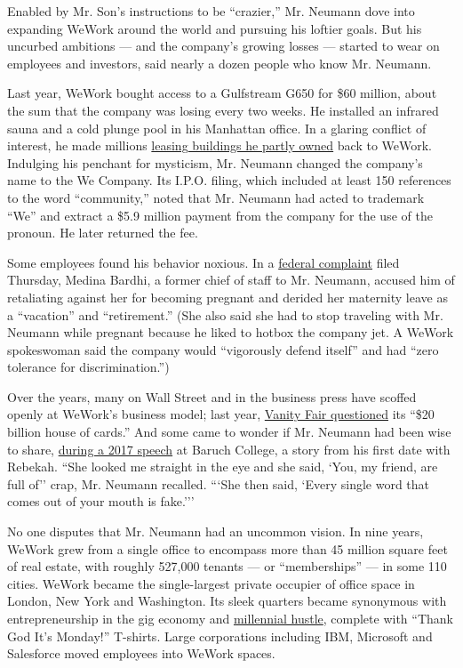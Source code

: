 Enabled by Mr. Son's instructions to be ``crazier,'' Mr. Neumann dove
into expanding WeWork around the world and pursuing his loftier goals.
But his uncurbed ambitions --- and the company's growing losses ---
started to wear on employees and investors, said nearly a dozen people
who know Mr. Neumann.

Last year, WeWork bought access to a Gulfstream G650 for \$60 million,
about the sum that the company was losing every two weeks. He installed
an infrared sauna and a cold plunge pool in his Manhattan office. In a
glaring conflict of interest, he made millions
\href{https://www.wsj.com/articles/weworks-ceo-makes-millions-as-landlord-to-wework-11547640000}{leasing
buildings he partly owned} back to WeWork. Indulging his penchant for
mysticism, Mr. Neumann changed the company's name to the We Company. Its
I.P.O. filing, which included at least 150 references to the word
``community,'' noted that Mr. Neumann had acted to trademark ``We'' and
extract a \$5.9 million payment from the company for the use of the
pronoun. He later returned the fee.

Some employees found his behavior noxious. In a
\href{https://www.nytimes3xbfgragh.onion/2019/10/31/business/wework-neumann-discrimination-complaint.html}{federal
complaint} filed Thursday, Medina Bardhi, a former chief of staff to Mr.
Neumann, accused him of retaliating against her for becoming pregnant
and derided her maternity leave as a ``vacation'' and ``retirement.''
(She also said she had to stop traveling with Mr. Neumann while pregnant
because he liked to hotbox the company jet. A WeWork spokeswoman said
the company would ``vigorously defend itself'' and had ``zero tolerance
for discrimination.'')

Over the years, many on Wall Street and in the business press have
scoffed openly at WeWork's business model; last year,
\href{https://www.vanityfair.com/news/2018/04/wework-bond-sale-financial-analysis}{Vanity
Fair questioned} its ``\$20 billion house of cards.'' And some came to
wonder if Mr. Neumann had been wise to share,
\href{https://www.youtube.com/watch?v=wX5tREnC-FE}{during a 2017 speech}
at Baruch College, a story from his first date with Rebekah. ``She
looked me straight in the eye and she said, `You, my friend, are full
of'' crap, Mr. Neumann recalled. ```She then said, `Every single word
that comes out of your mouth is fake.'''

No one disputes that Mr. Neumann had an uncommon vision. In nine years,
WeWork grew from a single office to encompass more than 45 million
square feet of real estate, with roughly 527,000 tenants --- or
``memberships'' --- in some 110 cities. WeWork became the single-largest
private occupier of office space in London, New York and Washington. Its
sleek quarters became synonymous with entrepreneurship in the gig
economy and
\href{https://www.nytimes3xbfgragh.onion/2019/01/26/business/against-hustle-culture-rise-and-grind-tgim.html}{millennial
hustle}, complete with ``Thank God It's Monday!'' T-shirts. Large
corporations including IBM, Microsoft and Salesforce moved employees
into WeWork spaces.


